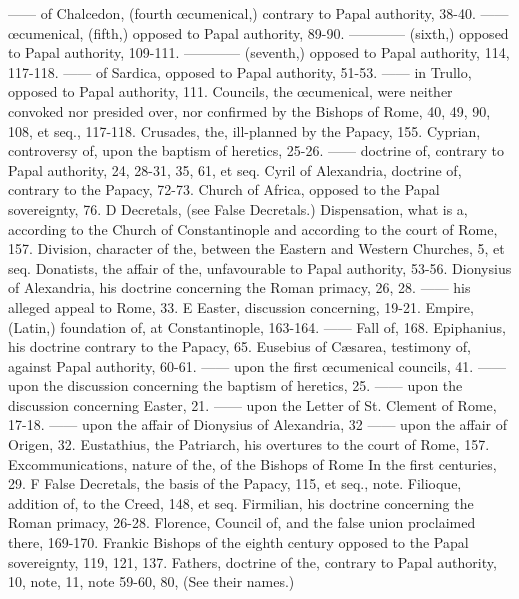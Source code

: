 —— of Chalcedon, (fourth œcumenical,) contrary to Papal authority, 38-40. —— œcumenical, (fifth,) opposed to Papal authority, 89-90. ———— (sixth,) opposed to Papal authority, 109-111. ———— (seventh,) opposed to Papal authority, 114, 117-118. —— of Sardica, opposed to Papal authority, 51-53. —— in Trullo, opposed to Papal authority, 111. Councils, the œcumenical, were neither convoked nor presided over, nor confirmed by the Bishops of Rome, 40, 49, 90, 108, et seq., 117-118. Crusades, the, ill-planned by the Papacy, 155. Cyprian, controversy of, upon the baptism of heretics, 25-26. —— doctrine of, contrary to Papal authority, 24, 28-31, 35, 61, et seq. Cyril of Alexandria, doctrine of, contrary to the Papacy, 72-73. Church of Africa, opposed to the Papal sovereignty, 76. D Decretals, (see False Decretals.) Dispensation, what is a, according to the Church of Constantinople and according to the court of Rome, 157. Division, character of the, between the Eastern and Western Churches, 5, et seq. Donatists, the affair of the, unfavourable to Papal authority, 53-56. Dionysius of Alexandria, his doctrine concerning the Roman primacy, 26, 28. —— his alleged appeal to Rome, 33. E Easter, discussion concerning, 19-21. Empire, (Latin,) foundation of, at Constantinople, 163-164. —— Fall of, 168. Epiphanius, his doctrine contrary to the Papacy, 65. Eusebius of Cæsarea, testimony of, against Papal authority, 60-61. —— upon the first œcumenical councils, 41. —— upon the discussion concerning the baptism of heretics, 25. —— upon the discussion concerning Easter, 21. —— upon the Letter of St. Clement of Rome, 17-18. —— upon the affair of Dionysius of Alexandria, 32 —— upon the affair of Origen, 32. Eustathius, the Patriarch, his overtures to the court of Rome, 157. Excommunications, nature of the, of the Bishops of Rome In the first centuries, 29. F False Decretals, the basis of the Papacy, 115, et seq., note. Filioque, addition of, to the Creed, 148, et seq. Firmilian, his doctrine concerning the Roman primacy, 26-28. Florence, Council of, and the false union proclaimed there, 169-170. Frankic Bishops of the eighth century opposed to the Papal sovereignty, 119, 121, 137. Fathers, doctrine of the, contrary to Papal authority, 10, note, 11, note 59-60, 80, (See their names.)

